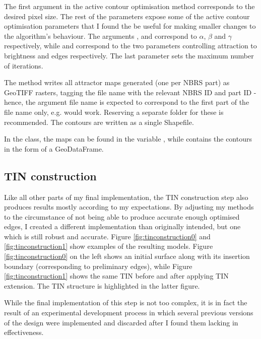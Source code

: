 The first argument  in the active contour optimisation method corresponds to the desired pixel size. The rest of the parameters expose some of the active contour optimisation parameters that I found the be useful for making smaller changes to the algorithm's behaviour. The arguments ,  and  correspond to $\alpha$, $\beta$ and $\gamma$ respectively, while  and  correspond to the two parameters controlling attraction to brightness and edges respectively. The last parameter sets the maximum number of iterations.

The  method writes all attractor maps generated (one per NBRS part) as GeoTIFF rasters, tagging the file name with the relevant NBRS ID and part ID - hence, the argument file name is expected to correspond to the first part of the file name only, e.g.  would work. Reserving a separate folder for these is recommended. The contours are written as a single Shapefile.

In the class, the maps can be found in the variable , while  contains the contours in the form of a GeoDataFrame.

\subsection{TIN construction}
\label{sub:r_tinconstruction}

Like all other parts of my final implementation, the TIN construction step also produces results mostly according to my expectations. By adjusting my methods to the circumstance of not being able to produce accurate enough optimised edges, I created a different implementation than originally intended, but one which is still robust and accurate. Figure \ref{fig:tinconstruction0} and \ref{fig:tinconstruction1} show examples of the resulting models. Figure \ref{fig:tinconstruction0} on the left shows an initial surface along with its insertion boundary (corresponding to preliminary edges), while Figure \ref{fig:tinconstruction1} shows the same TIN before and after applying TIN extension. The TIN structure is highlighted in the latter figure.

While the final implementation of this step is not too complex, it is in fact the result of an experimental development process in which several previous versions of the design were implemented and discarded after I found them lacking in effectiveness.


